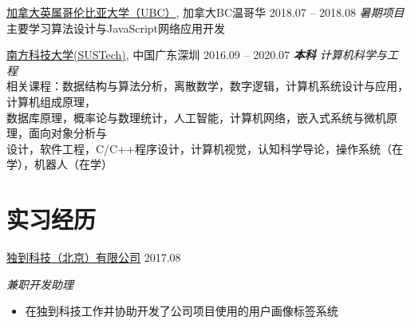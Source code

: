 \documentclass[hidelinks__VERSION__]{adamyi-cv}
\begin{document}
\begin{entrylist}


\entry
{\href{https://www.ubc.ca/}{\heir 加拿大英属哥伦比亚大学（UBC）}, \hei 加拿大BC温哥华}
{2018.07 -- 2018.08}
{\hei \emph{暑期项目}\\
主要学习算法设计与JavaScript网络应用开发
}

\entry
{\href{https://www.sustech.edu.cn/}{\heir 南方科技大学(SUSTech)}, \hei 中国广东深圳}
{2016.09 -- 2020.07}
{\hei \emph{\textbf{\hei 本科} 计算机科学与工程}\\
相关课程：数据结构与算法分析，离散数学，数字逻辑，计算机系统设计与应用，计算机组成原理，\\
数据库原理，概率论与数理统计，人工智能，计算机网络，嵌入式系统与微机原理，面向对象分析与\\
设计，软件工程，C/C++程序设计，计算机视觉，认知科学导论，操作系统（在学），机器人（在学）
}

\end{entrylist}


\section{\heir 实习\heir 经历}

\begin{entrylist}


\entry
{\href{http://www.doodod.com/}{\heir 独到科技（北京）有限公司}}
{2017.08}
{\emph{\hei 兼职开发助理}
\begin{itemize}
\item {\hei 在独到科技工作并协助开发了公司项目使用的用户画像标签系统}
\end{itemize}}


\end{entrylist}

\end{document}
